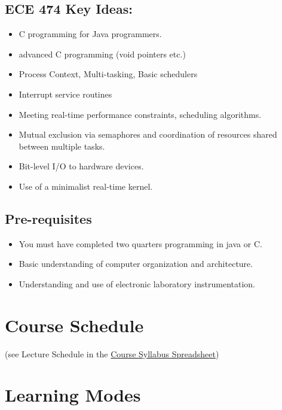 \documentclass{article}	%
\begin{document}
\subsection{ECE 474 Key Ideas:}
\begin{itemize}
        \item C programming for Java programmers.
        \item advanced C programming (void pointers etc.)
        \item Process Context, Multi-tasking, Basic schedulers
        \item Interrupt service routines
        \item Meeting real-time performance constraints, scheduling algorithms.
        \item Mutual exclusion via semaphores
             and coordination of resources shared between multiple tasks.
        \item Bit-level I/O to hardware devices.
        \item Use of a minimalist real-time kernel.
\end{itemize}



\subsection{Pre-requisites}
\begin{itemize}
        \item  You must have completed two quarters programming in java or C.
        \item  Basic understanding of computer organization and architecture.
        \item  Understanding and use of electronic laboratory instrumentation.
\end{itemize}



\section{Course Schedule}

(see Lecture Schedule in the 
\href{https://docs.google.com/spreadsheets/d/1pLo5GvlvPP_WHET6sbK7IhZyR_x2ABR-7OutT0kR_mc/edit#gid=0}
{Course Syllabus Spreadsheet})

\section{Learning Modes}
\end{document}
